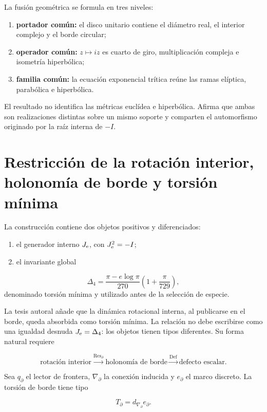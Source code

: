 La fusión geométrica se formula en tres niveles:

\begin{enumerate}
\item \textbf{portador común:} el disco unitario contiene el diámetro real, el interior complejo y el borde circular;
\item \textbf{operador común:} \(z\mapsto iz\) es cuarto de giro, multiplicación compleja e isometría hiperbólica;
\item \textbf{familia común:} la ecuación exponencial trítica reúne las ramas elíptica, parabólica e hiperbólica.
\end{enumerate}

El resultado no identifica las métricas euclídea e hiperbólica. Afirma que ambas son realizaciones distintas sobre un mismo soporte y comparten el automorfismo originado por la raíz interna de \(-I\).


\section{Restricción de la rotación interior, holonomía de borde y torsión mínima}

La construcción contiene dos objetos positivos y diferenciados:

\begin{enumerate}
\item el generador interno \(J_{\rm e}\), con \(J_{\rm e}^2=-I\);
\item el invariante global
\end{enumerate}
   \[
   \Delta_4=
   \frac{\pi-e\log\pi}{270}
   \left(1+\frac{\pi}{729}\right),
   \]
   denominado torsión mínima y utilizado antes de la selección de especie.

La tesis autoral añade que la dinámica rotacional interna, al publicarse en el borde, queda absorbida como torsión mínima. La relación no debe escribirse como una igualdad desnuda \(J_{\rm e}=\Delta_4\): los objetos tienen tipos diferentes. Su forma natural requiere

\[
\text{rotación interior}
\xrightarrow{\operatorname{Res}_{\partial}}
\text{holonomía de borde}
\xrightarrow{\operatorname{Def}}
\text{defecto escalar}.
\]

Sea \(q_\partial\) el lector de frontera, \(\nabla_\partial\) la conexión inducida y \(e_\partial\) el marco discreto. La torsión de borde tiene tipo

\[
T_\partial=d_{\nabla_\partial}e_\partial.
\]

